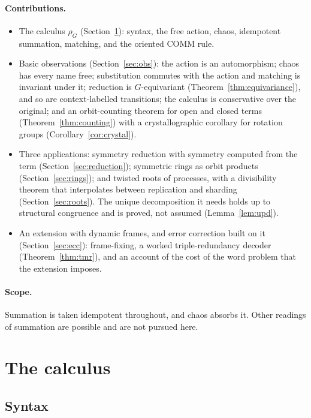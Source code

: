 \documentclass[11pt]{article}
\theoremstyle{definition}
\theoremstyle{remark}
\newcommand{\calc}{\rho_G}
\begin{document}
\paragraph{Contributions.}
\begin{itemize}[leftmargin=1.5em]
\item The calculus $\calc$ (Section~\ref{sec:calculus}): syntax, the free
  action, chaos, idempotent summation, matching, and the oriented COMM rule.
\item Basic observations (Section~\ref{sec:obs}): the action is an
  automorphism; chaos has every name free; substitution commutes with the
  action and matching is invariant under it; reduction is $G$-equivariant
  (Theorem~\ref{thm:equivariance}), and so are context-labelled transitions;
  the calculus is conservative over the original; and an orbit-counting
  theorem for open and closed terms
  (Theorem~\ref{thm:counting}) with a crystallographic corollary for rotation
  groups (Corollary~\ref{cor:crystal}).
\item Three applications: symmetry reduction with symmetry computed from the
  term (Section~\ref{sec:reduction}); symmetric rings as orbit products
  (Section~\ref{sec:rings}); and twisted roots of processes, with a
  divisibility theorem that interpolates between replication and sharding
  (Section~\ref{sec:roots}). The unique decomposition it needs holds up to
  structural congruence and is proved, not assumed
  (Lemma~\ref{lem:upd}).
\item An extension with dynamic frames, and error correction built on it
  (Section~\ref{sec:ecc}): frame-fixing, a worked triple-redundancy decoder
  (Theorem~\ref{thm:tmr}), and an account of the cost of the word problem
  that the extension imposes.
\end{itemize}

\paragraph{Scope.}
Summation is taken idempotent throughout, and chaos absorbs it. Other readings
of summation are possible and are not pursued here.

\section{The calculus}\label{sec:calculus}

\subsection{Syntax}
\end{document}

